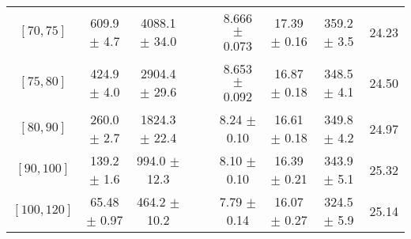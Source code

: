 \begin{tabular}{c||c|c|c|c|c|c|c||c}
$[70, 75]$ & 609.9 $\pm$ 4.7 & 4088.1 $\pm$ 34.0 &  &  & 8.666 $\pm$ 0.073 & 17.39 $\pm$ 0.16 & 359.2 $\pm$ 3.5 & 24.23\\
$[75, 80]$ & 424.9 $\pm$ 4.0 & 2904.4 $\pm$ 29.6 &  &  & 8.653 $\pm$ 0.092 & 16.87 $\pm$ 0.18 & 348.5 $\pm$ 4.1 & 24.50\\
$[80, 90]$ & 260.0 $\pm$ 2.7 & 1824.3 $\pm$ 22.4 &  &  & 8.24 $\pm$ 0.10 & 16.61 $\pm$ 0.18 & 349.8 $\pm$ 4.2 & 24.97\\
$[90, 100]$ & 139.2 $\pm$ 1.6 & 994.0 $\pm$ 12.3 &  &  & 8.10 $\pm$ 0.10 & 16.39 $\pm$ 0.21 & 343.9 $\pm$ 5.1 & 25.32\\
$[100, 120]$ & 65.48 $\pm$ 0.97 & 464.2 $\pm$ 10.2 &  &  & 7.79 $\pm$ 0.14 & 16.07 $\pm$ 0.27 & 324.5 $\pm$ 5.9 & 25.14\\
\end{tabular}
